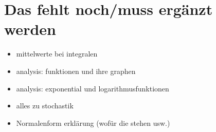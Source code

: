 \chapter{Das fehlt noch/muss ergänzt werden}
\begin{itemize}
    \item mittelwerte bei integralen
    \item analysis: funktionen und ihre graphen
    \item analysis: exponential und logarithmusfunktionen
    \item alles zu stochastik
    \item Normalenform erklärung (wofür die stehen usw.)
\end{itemize}

